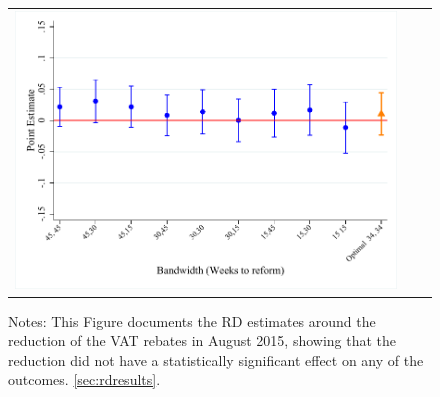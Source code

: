 \documentclass[12pt,notitlepage,a4paper]{article}
\begin{document}
\begin{landscape}
\begin{figure}[ht]
{\begin{tabular}{c c c }
\includegraphics[scale=.4]{output/robust_log_count_pos_total_3_d_w_0815.pdf} \\
\end{tabular}\par}
 	\vspace{.2cm} %
\begin{spacing}{0.6}
\footnotesize Notes: This Figure  documents the RD estimates around the reduction of the VAT rebates in August 2015, showing that the reduction did not have a statistically significant effect on any of the outcomes.  \ref{sec:rdresults}.
\end{spacing}
\end{figure}
\end{landscape}
\end{document}
